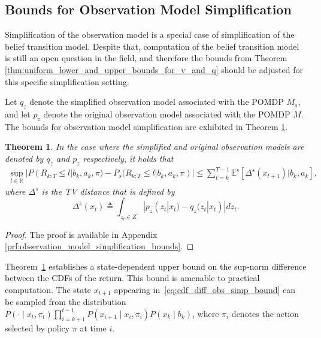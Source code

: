 \documentclass[acmlarge, manuscript, screen, review, natbib=false, oneside]{acmart}
\newtheorem{theorem}{Theorem}[section]
\begin{document}
\subsection{Bounds for Observation Model Simplification}\label{sec:simp_obs_bound}
Simplification of the observation model is a special case of simplification of the belief transition model. Despite that, computation of the belief transition model is still an open question in the field, and therefore the bounds from Theorem \ref{thm:uniform_lower_and_upper_bounds_for_v_and_q} should be adjusted for this specific simplification setting. 

Let \( q_z \) denote the simplified observation model associated with the POMDP \( M_s \), and let \( p_z \) denote the original observation model associated with the POMDP \( M \). The bounds for observation model simplification are exhibited in Theorem \ref{thm:observation_model_simplification_bounds}.
\begin{theorem}\label{thm:observation_model_simplification_bounds}
	In the case where the simplified and original observation models are denoted by $q_z$ and $p_z$ respectively, it holds that
	\begin{equation}\label{eq:cdf_diff_obs_simp_bound}
		\begin{aligned}
			\sup_{l\in \mathbb{R}}|P(R_{k:T} \leq l|b_k, a_k,\pi) \! -\! P_s(R_{k:T} \leq l|b_k, a_k,\pi)| \!
			\leq \!\! \! \sum_{t=k}^{T-1} \mathbb{E}^s[\Delta^s(x_{t+1})|b_k, a_k],
		\end{aligned}
	\end{equation}
	where $\Delta^s$ is the TV distance that is defined by 
	\begin{equation}\label{eq:TVdistState}
		\Delta^s(x_{t}) \triangleq \int_{z_{t}\in Z} |p_z(z_{t}|x_t)-q_z(z_t|x_t)|dz_t.
	\end{equation}
\end{theorem}
\begin{proof}
	The proof is available in Appendix \ref{prf:observation_model_simplification_bounds}.
\end{proof}
Theorem~\ref{thm:observation_model_simplification_bounds} establishes a state-dependent upper bound on the sup-norm difference between the CDFs of the return. This bound is amenable to practical computation. The state $x_{t+1}$ appearing in~\eqref{eq:cdf_diff_obs_simp_bound} can be sampled from the distribution
$P(\cdot \mid x_t, \pi_t) \prod_{i=k+1}^{t-1} P(x_{i+1} \mid x_i, \pi_i) P(x_k \mid b_k)$,
where $\pi_i$ denotes the action selected by policy $\pi$ at time $i$. 
\end{document}
